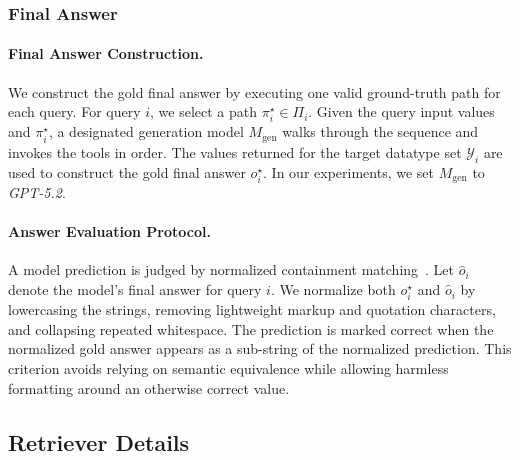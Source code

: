 \documentclass{llmxive}
\begin{document}
\subsubsection{Final Answer}
\label{app:final-answer-groundtruth}



\paragraph{Final Answer Construction.}
We construct the gold final answer by executing one valid ground-truth path for each query. 
For query $i$, we select a path $\pi_i^\star \in \Pi_i$. 
Given the query input values and $\pi_i^\star$, a designated generation model $M_{\mathrm{gen}}$ walks through the sequence and invokes the tools in order. 
The values returned for the target datatype set $\mathcal{Y}_i$ are used to construct the gold final answer $o_i^\star$. 
In our experiments, we set $M_{\mathrm{gen}}$ to \textit{GPT-5.2}.

\paragraph{Answer Evaluation Protocol.}
A model prediction is judged by normalized containment matching~\citep{NAACL}. 
Let $\hat{o}_i$ denote the model's final answer for query $i$. 
We normalize both $o_i^\star$ and $\hat{o}_i$ by lowercasing the strings, removing lightweight markup and quotation characters, and collapsing repeated whitespace. 
The prediction is marked correct when the normalized gold answer appears as a sub-string of the normalized prediction. 
This criterion avoids relying on semantic equivalence while allowing harmless formatting around an otherwise correct value.

\subsection{Retriever Details}
\label{app:retriever-details}


\end{document}
